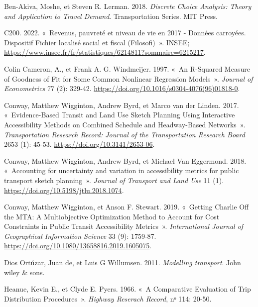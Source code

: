 \documentclass[
  10pt,
  a4paper,
  numbers=noendperiod,
  DIV=9]{scrartcl}
\newlength{\cslhangindent}
\newlength{\cslentryspacingunit} %
\newenvironment{CSLReferences}[2] %
 {%
  \setlength{\parindent}{0pt}
  \ifodd #1
  \let\oldpar\par
  \def\par{\hangindent=\cslhangindent\oldpar}
  \fi
  \setlength{\parskip}{#2\cslentryspacingunit}
 }%
 {}
\begin{document}
\hypertarget{refs}{}
\begin{CSLReferences}{1}{0}
\leavevmode{}%
Ben-Akiva, Moshe, et Steven R. Lerman. 2018. \emph{Discrete Choice
Analysis: Theory and Application to Travel Demand}. Transportation
Series. MIT Press.

\leavevmode{}%
C200. 2022. {«~Revenus, pauvreté et niveau de vie en 2017 - Données
carroyées. Dispositif Fichier localisé social et fiscal (Filosofi)~»}.
INSEE;
\url{https://www.insee.fr/fr/statistiques/6214811?sommaire=6215217}.

\leavevmode{}%
Colin Cameron, A., et Frank A. G. Windmeijer. 1997. {«~An R-Squared
Measure of Goodness of Fit for Some Common Nonlinear Regression
Models~»}. \emph{Journal of Econometrics} 77 (2): 329‑42.
\url{https://doi.org/10.1016/s0304-4076(96)01818-0}.

\leavevmode{}%
Conway, Matthew Wigginton, Andrew Byrd, et Marco van der Linden. 2017.
{«~Evidence-Based Transit and Land Use Sketch Planning Using Interactive
Accessibility Methods on Combined Schedule and Headway-Based
Networks~»}. \emph{Transportation Research Record: Journal of the
Transportation Research Board} 2653 (1): 45‑53.
\url{https://doi.org/10.3141/2653-06}.

\leavevmode{}%
Conway, Matthew Wigginton, Andrew Byrd, et Michael Van Eggermond. 2018.
{«~Accounting for uncertainty and variation in accessibility metrics for
public transport sketch planning~»}. \emph{Journal of Transport and Land
Use} 11 (1). \url{https://doi.org/10.5198/jtlu.2018.1074}.

\leavevmode{}%
Conway, Matthew Wigginton, et Anson F. Stewart. 2019. {«~Getting Charlie
Off the MTA: A Multiobjective Optimization Method to Account for Cost
Constraints in Public Transit Accessibility Metrics~»}.
\emph{International Journal of Geographical Information Science} 33 (9):
1759‑87. \url{https://doi.org/10.1080/13658816.2019.1605075}.

\leavevmode{}%
Dios Ortúzar, Juan de, et Luis G Willumsen. 2011. \emph{Modelling
transport}. John wiley \& sons.

\leavevmode{}%
Heanue, Kevin E., et Clyde E. Pyers. 1966. {«~A Comparative Evaluation
of Trip Distribution Procedures~»}. \emph{Highway Reserach Record}, nᵒ
114: 20‑50.


\end{CSLReferences}
\end{document}
